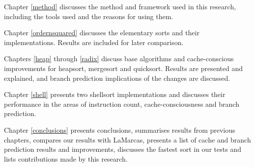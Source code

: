 Chapter \ref{method} discusses the method and framework used in this research,
including the tools used and the reasons for using them.

Chapter \ref{ordernsquared}  discusses the elementary sorts and their
implementations. Results are included for later comparison.

Chapters \ref{heap} through \ref{radix} discuss base algorithms and
cache-conscious improvements for heapsort, mergesort and quicksort. Results are
presented and explained, and branch prediction implications of the changes are
discussed.

Chapter \ref{shell} presents two shellsort implementations and discusses their
performance in the areas of instruction count, cache-consciousness and branch
prediction.

Chapter \ref{conclusions} presents conclusions, summarises results from previous
chapters, compares our results with LaMarcas, presents a list of cache and
branch prediction results and improvements, discusses the fastest sort in our
tests and lists contributions made by this research.
